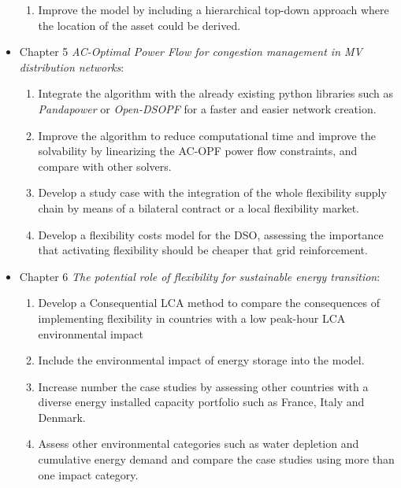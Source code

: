 \begin{itemize}
\begin{enumerate}
		\item Improve the model by including a hierarchical top-down approach where the location of the asset could be derived. 
	\end{enumerate}
\item Chapter 5 \textit{AC-Optimal Power Flow for congestion management in MV distribution networks}: 
	\begin{enumerate}
		\item Integrate the algorithm with the already existing python libraries such as \textit{Pandapower} or \textit{Open-DSOPF} for a faster and easier network creation. 
		\item Improve the algorithm to reduce computational time and improve the solvability by linearizing the AC-OPF power flow constraints, and compare with other solvers. 
		\item Develop a study case with the integration of the whole flexibility supply chain by means of a bilateral contract or a local flexibility market. 
		\item Develop a flexibility costs model for the DSO, assessing the importance that activating flexibility should be cheaper that grid reinforcement. 
	\end{enumerate}
\item Chapter 6 \textit{The potential role of flexibility for sustainable energy transition}: 
	\begin{enumerate}
		\item Develop a Consequential LCA method to compare the consequences of implementing flexibility in countries with a low peak-hour LCA environmental impact
		\item Include the environmental impact of energy storage into the model. 
		\item Increase number the case studies by assessing other countries with a diverse energy installed capacity portfolio such as France, Italy and Denmark. 
		\item Assess other environmental categories such as water depletion and cumulative energy demand and compare the case studies using more than one impact category. 
	\end{enumerate}
\end{itemize}
